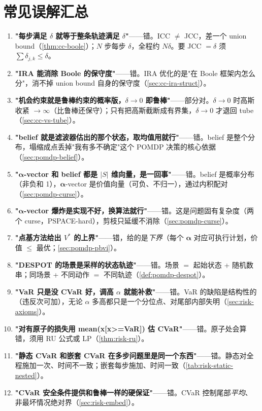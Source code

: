 \section{常见误解汇总}
\label{sec:plan-chance-misc}

\begin{enumerate}
  \item \textbf{"每步满足 $\delta$ 就等于整条轨迹满足 $\delta$"}——错。ICC $\ne$ JCC，差一个 union bound（\cref{thm:cc-boole}）；$N$ 步每步 $\delta$，全程约 $N\delta$。要 JCC $=\delta$ 须 $\sum\delta_{j,k}\le\delta$。
  \item \textbf{"IRA 能消除 Boole 的保守度"}——错。IRA 优化的是"在 Boole 框架内怎么分"，消不掉 union bound 自身的保守度（\cref{sec:cc-ira-struct}）。
  \item \textbf{"机会约束就是鲁棒约束的概率版，$\delta\to0$ 即鲁棒"}——部分对。$\delta\to0$ 时高斯收紧 $\to\infty$（比鲁棒还保守）；只有把高斯截断成有界集，$\delta\to0$ 才退回 tube（\cref{sec:cc-vs-tube}）。
  \item \textbf{"belief 就是滤波器估出的那个状态，取均值用就行"}——错。belief 是整个分布，塌缩成点丢掉"我有多不确定"这个 POMDP 决策的核心依据（\cref{sec:pomdp-belief}）。
  \item \textbf{"$\boldsymbol{\alpha}$-vector 和 belief 都是 $|S|$ 维向量，是一回事"}——错。belief 是概率分布（非负和 1），$\boldsymbol{\alpha}$-vector 是价值向量（可负、不归一），通过内积配对（\cref{sec:pomdp-curse}）。
  \item \textbf{"$\boldsymbol{\alpha}$-vector 爆炸是实现不好，换算法就行"}——错。这是问题固有复杂度（两个 curse，PSPACE-hard），剪枝只延缓不消除（\cref{sec:pomdp-curse}）。
  \item \textbf{"点基方法给出 $V^*$ 的上界"}——错，给的是\emph{下界}（每个 $\boldsymbol{\alpha}$ 对应可执行计划，价值 $\le$ 最优；\cref{sec:pomdp-pbvi}）。
  \item \textbf{"DESPOT 的场景是采样的状态轨迹"}——错。场景 $=$ 起始状态 + 随机数串；同场景 + 不同动作 $=$ 不同轨迹（\cref{def:pomdp-despot}）。
  \item \textbf{"VaR 只是没 CVaR 好，调高 $\alpha$ 就能补救"}——错。VaR 的缺陷是结构性的（违反次可加），无论 $\alpha$ 多高都只是一个分位点、对尾部内部失明（\cref{sec:risk-axioms}）。
  \item \textbf{"对有原子的损失用 mean(x[x>=VaR]) 估 CVaR"}——错。原子处会算错，须用 RU 公式或 LP（\cref{thm:risk-ru}）。
  \item \textbf{"静态 CVaR 和嵌套 CVaR 在多步问题里是同一个东西"}——错。静态对全程施加一次、时间不一致；嵌套每步施加、时间一致（\cref{tab:risk-static-nested}）。
  \item \textbf{"CVaR 安全条件提供和鲁棒一样的硬保证"}——错。CVaR 控制尾部\emph{平均}、非最坏情况绝对界（\cref{sec:risk-embed}）。
\end{enumerate}

